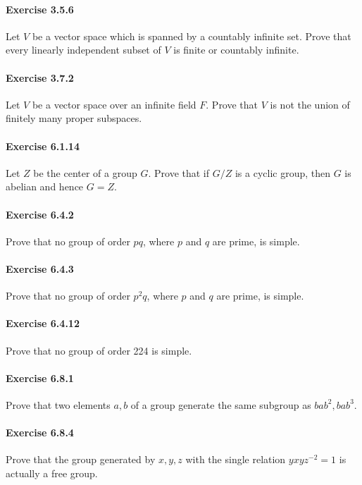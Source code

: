 \documentclass{article}
\begin{document}
\paragraph{Exercise 3.5.6} Let $V$ be a vector space which is spanned by a countably infinite set. Prove that every linearly independent subset of $V$ is finite or countably infinite.

\paragraph{Exercise 3.7.2} Let $V$ be a vector space over an infinite field $F$. Prove that $V$ is not the union of finitely many proper subspaces.

\paragraph{Exercise 6.1.14} Let $Z$ be the center of a group $G$. Prove that if $G / Z$ is a cyclic group, then $G$ is abelian and hence $G=Z$.

\paragraph{Exercise 6.4.2} Prove that no group of order $p q$, where $p$ and $q$ are prime, is simple.

\paragraph{Exercise 6.4.3} Prove that no group of order $p^2 q$, where $p$ and $q$ are prime, is simple.

\paragraph{Exercise 6.4.12} Prove that no group of order 224 is simple.

\paragraph{Exercise 6.8.1} Prove that two elements $a, b$ of a group generate the same subgroup as $b a b^2, b a b^3$.

\paragraph{Exercise 6.8.4} Prove that the group generated by $x, y, z$ with the single relation $y x y z^{-2}=1$ is actually a free group.
\end{document}
